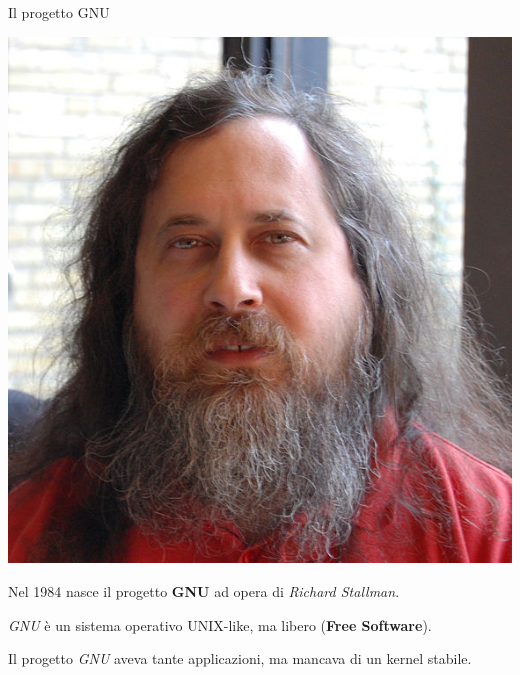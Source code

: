 \documentclass[10pt]{beamer}
\begin{document}
\begin{frame}[fragile]{Il progetto GNU}

\includegraphics[scale=0.5]{stallman}

Nel 1984 nasce il progetto \textbf{GNU} ad opera di \textit{Richard Stallman}.

\textit{GNU} è un sistema operativo UNIX-like, ma libero (\textbf{Free Software}).

Il progetto \textit{GNU} aveva tante applicazioni, ma mancava di un kernel stabile.

\end{frame}
\end{document}
